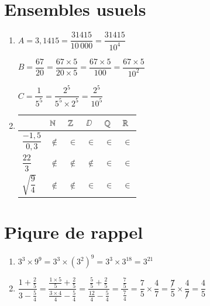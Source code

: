 \documentclass[oneside,12pt]{exam}          %
\begin{document}
\section{Ensembles usuels}
\begin{enumerate}
	\item
	$A = 3,1415 = \dfrac{31415}{10\,000} = \dfrac{31415}{10^4}$
	
	$B = \dfrac{67}{20}	= \dfrac{67 \times 5}{20 \times 5} = \dfrac{67 \times 5}{100} = \dfrac{67 \times 5}{10^2}$
	
	$C = \dfrac{1}{5^5} = \dfrac{2^5}{5^5 \times 2^5} = \dfrac{2^5}{10^5}$

	\item
	\begin{center}
		\renewcommand{\arraystretch}{2}
		\begin{tabular}{| P{4cm} || P{2cm} | P{2cm} | P{2cm} | P{2cm} | P{2cm} |} \hline
			 & ${\mathbb N}$ & ${\mathbb Z}$ & $\DD$ & ${\mathbb Q}$ & ${\mathbb R}$ \\ \hline \hline
			$\dfrac{-1,5}{0,3}$ & $\notin$ & $\in$ & $\in$ & $\in$ & $\in$ \\ \hline
			$\dfrac{22}{3}$ & $\notin$ & $\notin$ & $\notin$  & $\in$ & $\in$ \\ \hline
			$\sqrt{\dfrac{9}{4}}$ & $\notin$ & $\notin$ & $\in$ & $\in$ & $\in$ \\ \hline
		\end{tabular}
	\end{center}
\end{enumerate}


\section{Piqure de rappel}
\begin{enumerate}[itemsep=2mm]
	\item $3^3 \times 9^9 = 3^3 \times {(3^2)}^9 = 3^3 \times 3^{18} = 3^{21}$
	
	\item
	$\dfrac{1 + \frac{2}{5}}{3 - \frac{5}{4}} =
	\dfrac{\frac{1 \times 5}{5} + \frac{2}{5}}{\frac{3 \times 4}{4} - \frac{5}{4}}
	= \dfrac{\frac{5}{5} + \frac{2}{5}}{\frac{12}{4} - \frac{5}{4}}
	= \dfrac{\,\frac{7}{5}\,}{\frac{7}{4}}
	= \dfrac{7}{5} \times \dfrac{4}{7} = \dfrac{\not 7}{5} \times \dfrac{4}{\not 7} = \dfrac{4}{5}$
\end{enumerate}
\end{document}
